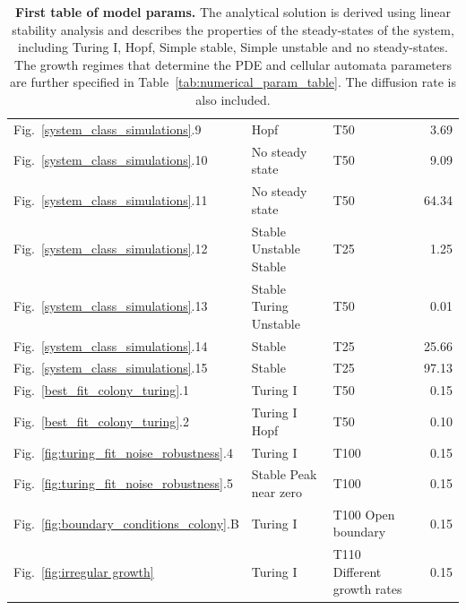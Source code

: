\begin{table}
\begin{adjustbox}{center}
\begin{tabular}{lllr}
             Fig.~\ref{system_class_simulations}.9 & Hopf & T50 & 3.69 \\
             Fig.~\ref{system_class_simulations}.10 & No steady state & T50 & 9.09 \\
             Fig.~\ref{system_class_simulations}.11 & No steady state & T50 & 64.34 \\
             Fig.~\ref{system_class_simulations}.12 & Stable Unstable Stable & T25 & 1.25 \\
             Fig.~\ref{system_class_simulations}.13 & Stable Turing Unstable & T50 & 0.01 \\
             Fig.~\ref{system_class_simulations}.14 & Stable & T25 & 25.66 \\
             Fig.~\ref{system_class_simulations}.15 & Stable & T25 & 97.13 \\
             Fig.~\ref{best_fit_colony_turing}.1 & Turing I & T50 & 0.15 \\
             Fig.~\ref{best_fit_colony_turing}.2 & Turing I Hopf & T50 & 0.10 \\
             Fig.~\ref{fig:turing_fit_noise_robustness}.4 & Turing I & T100 & 0.15 \\
             Fig.~\ref{fig:turing_fit_noise_robustness}.5 & Stable Peak near zero & T100 & 0.15 \\
             Fig.~\ref{fig:boundary_conditions_colony}.B & Turing I & T100 Open boundary & 0.15 \\
             Fig.~\ref{fig:irregular growth} & Turing I & T110 Different growth rates & 0.15 \\
            \bottomrule
        \end{tabular}
    \end{adjustbox}
    \caption{\textbf{First table of model params.} The analytical solution is derived using linear stability analysis and describes the properties of the steady-states of the system, including Turing I, Hopf, Simple stable, Simple unstable and no steady-states. The growth regimes that determine the PDE and cellular automata parameters are further specified in Table~\ref{tab:numerical_param_table}. The diffusion rate is also included.}


    \label{tab:model_param1}
\end{table}



